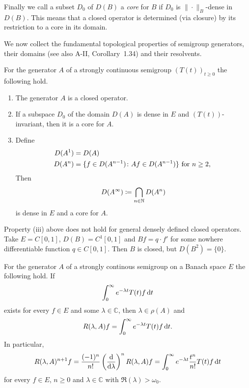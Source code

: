 Finally we call a subset $D_{0}$ of $D(B)$ a \emph{core} for $B$ if $D_{0}$ is $\|\cdot\|_{B}$-dense in $D(B)$.
This means that a closed operator is determined (via closure) by its restriction to a core in its domain.

We now collect the fundamental topological properties of semigroup generators, their domains (see also A-II, Corollary~1.34) and their resolvents.
\begin{proposition}\label{prop:a1-1.9}
For the generator $A$ of a strongly continuous semigroup $(T(t))_{t \geq 0}$ the following hold.
\begin{enumerate}[\upshape(i)]
\item 
The generator $A$ is a closed operator.

\item
If a subspace $D_{0}$ of the domain $D(A)$ is dense in $E$ and $(T(t))$-invariant, then it is a core for $A$.
\item Define 
%
\begin{align*}
	D(A^{1}) &= D(A) \\
	D(A^{n}) &= \{f \in D(A^{n-1}) \colon Af \in D(A^{n-1})\} \text{ for $ n \geq 2 $, }
\end{align*}
%
Then %
\[
	D(A^{\infty}) \coloneqq \bigcap_{n \in \mathbb{N}} D(A^{n})
\]
%
is dense in $E$ and a core for $A$.
\end{enumerate}
\end{proposition}
\begin{example}\label{ex:a1-1.10}
Property (iii) above does not hold for general densely defined closed operators.
Take $E = C\left[ 0,1 \right]$, $D(B) = C^{1}\left[ 0,1 \right]$ and $Bf = q \cdot f'$ for some nowhere differentiable function $q \in C\left[ 0,1 \right]$.
Then $B$ is closed, but $D(B^{2}) = \{0\}$.
\end{example}
\begin{proposition}\label{prop:a1-1.11}
For the generator $A$ of a strongly continous semigroup on a Banach space $E$ the following hold.
If %
\[
	 \int_{0}^{\infty} e^{-\lambda t}T(t)f \mathop{}\!\mathrm{d}{t} 
\]
%
exists for every $f \in E$ and some $\lambda \in \mathbb{C}$, then $\lambda \in \rho(A)$ and 
%
\[
	R(\lambda,A)f = \int_{0}^{\infty} e^{-\lambda t}T(t)f  \mathop{}\!\mathrm{d}{t}.
\]
%
In particular,
\begin{equation}\label{eq:a1-1.7}
R(\lambda,A)^{n+1}f 
	= \frac{(-1)^{n}}{n!}\left(\frac{\mathop{}\!\mathrm{d}{ }}{\mathop{}\!\mathrm{d}{\lambda}}\right)^{n} R(\lambda,A)f 
	= \int_{0}^{\infty} e^{-\lambda t}\frac{t^{n}}{n!}T(t)f  \mathop{}\!\mathrm{d}{t}
\end{equation}
for every $f \in E$, $n \geq 0$ and $\lambda \in \mathbb{C}$ with $\Re(\lambda) > \omega_{0}$.
\end{proposition}
